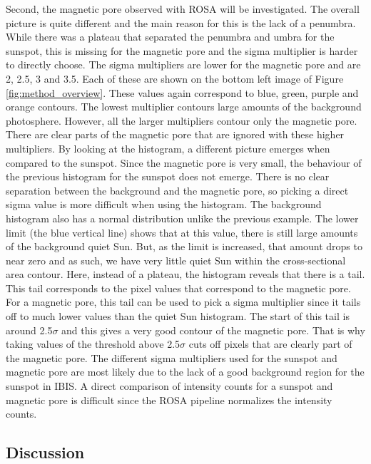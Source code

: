     Second, the magnetic pore observed with ROSA will be investigated.
    The overall picture is quite different and the main reason for this is the lack of a penumbra.
    While there was a plateau that separated the penumbra and umbra for the sunspot, this is missing for the magnetic pore and the sigma multiplier is harder to directly choose.
    The sigma multipliers are lower for the magnetic pore and are 2, 2.5, 3 and 3.5.
    Each of these are shown on the bottom left image of Figure \ref{fig:method_overview}.
    These values again correspond to blue, green, purple and orange contours.
    The lowest multiplier contours large amounts of the background photosphere.
    However, all the larger multipliers contour only the magnetic pore.
    There are clear parts of the magnetic pore that are ignored with these higher multipliers.
    By looking at the histogram, a different picture emerges when compared to the sunspot.
    Since the magnetic pore is very small, the behaviour of the previous histogram for the sunspot does not emerge.
    There is no clear separation between the background and the magnetic pore, so picking a direct sigma value is more difficult when using the histogram.
    The background histogram also has a normal distribution unlike the previous example.
    The lower limit (the blue vertical line) shows that at this value, there is still large amounts of the background quiet Sun.
    But, as the limit is increased, that amount drops to near zero and as such, we have very little quiet Sun within the cross-sectional area contour.
    Here, instead of a plateau, the histogram reveals that there is a tail.
    This tail corresponds to the pixel values that correspond to the magnetic pore.
    For a magnetic pore, this tail can be used to pick a sigma multiplier since it tails off to much lower values than the quiet Sun histogram.
    The start of this tail is around 2.5$\sigma$ and this gives a very good contour of the magnetic pore.
    That is why taking values of the threshold above 2.5$\sigma$ cuts off pixels that are clearly part of the magnetic pore.
    The different sigma multipliers used for the sunspot and magnetic pore are most likely due to the lack of a good background region for the sunspot in IBIS.
    A direct comparison of intensity counts for a sunspot and magnetic pore is difficult since the ROSA pipeline normalizes the intensity counts.
    
    \subsection{Discussion}
    
